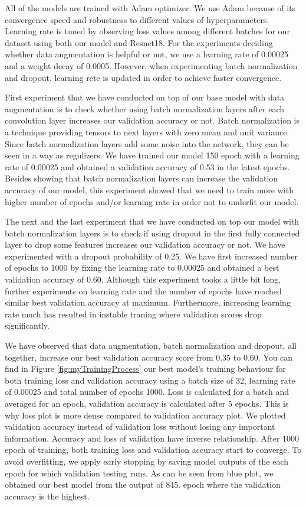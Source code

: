 \documentclass{article}
\begin{document}
All of the models are trained with Adam optimizer. We use Adam because of its convergence speed and robustness to different values of hyperparameters. Learning rate is tuned by observing loss values among different batches for our dataset using both our model and Resnet18. For the experiments deciding whether data augmentation is helpful or not, we use a learning rate of 0.00025 and a weight decay of 0.0005. However, when experimenting batch normalization and dropout, learning rete is updated in order to achieve faster convergence.

First experiment that we have conducted on top of our base model with data augmentation is to check whether using batch normalization layers after each convolution layer increases our validation accuracy or not. Batch normalization is a technique providing tensors to next layers with zero mean and unit variance. Since batch normalization layers add some noise into the network, they can be seen in a way as regulizers. We have trained our model 150 epoch with a learning rate of 0.00025 and obtained a validation accuracy of 0.53 in the latest epochs. Besides showing that batch normalization layers can increase the validation accuracy of our model, this experiment showed that we need to train more with higher number of epochs and/or learning rate in order not to underfit our model.

The next and the last experiment that we have conducted on top our model with batch normalization layers is to check if using dropout in the first fully connected layer to drop some features increases our validation accuracy or not. We have experimented with a dropout probability of 0.25. We have first increased number of epochs to 1000 by fixing the learning rate to 0.00025 and obtained  a best validation accuracy of 0.60. Although this experiment tooks a little bit long, further experiments on learning rate and the number of epochs have reached similar best validation accuracy at maximum. Furthermore, increasing learning rate much has resulted in instable traning where validation scores drop significantly.

We have observed that data augmentation, batch normalization and dropout, all together, increase our best validation accuracy score from 0.35 to 0.60. You can find in Figure \ref{fig:myTrainingProcess} our best model's training behaviour for both training loss and validation accuracy using a batch size of 32, learning rate of 0.00025 and total number of epochs 1000. Loss is calculated for a batch and averaged for an epoch, validation accuracy is calculated after 5 epochs. This is why loss plot is more dense compared to validation accuracy plot. We plotted validation accuracy instead of validation loss without losing any important information. Accuracy and loss of validation have inverse relationship. After 1000 epoch of training, both training loss and validation accuracy start to converge. To avoid overfitting, we apply early stopping by saving model outputs of the each epoch for which validation testing runs. As can be seen from blue plot, we obtained our best model from the output of 845. epoch where the validation accuracy is the highest.
\end{document}
